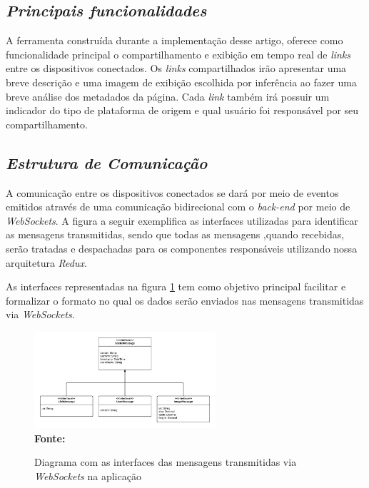 \subsection{{\it Principais funcionalidades}}

A ferramenta construída durante a implementação desse artigo, oferece como funcionalidade principal o compartilhamento e exibição em tempo real de \textit{links} entre os dispositivos conectados.
Os \textit{links} compartilhados irão apresentar uma breve descrição e uma imagem de exibição escolhida por inferência ao fazer uma breve análise dos metadados da página. Cada \textit{link} também irá possuir um indicador do tipo de plataforma de origem e qual usuário foi responsável por seu compartilhamento.

\subsection{{\it Estrutura de Comunicação}}

A comunicação entre os dispositivos conectados se dará por meio de eventos emitidos através de uma comunicação bidirecional com o \textit{back-end} por meio de \textit{WebSockets}. A figura a seguir exemplifica as interfaces utilizadas para identificar as mensagens transmitidas, sendo que todas as mensagens ,quando recebidas, serão tratadas e despachadas para os componentes responsáveis utilizando nossa arquitetura \textit{Redux}. 

As interfaces representadas na figura \ref{fig:figura2} tem como objetivo principal facilitar e formalizar o formato no qual os dados serão enviados nas mensagens transmitidas via \textit{WebSockets}.

\begin{figure}[ht]
	\centering	
	\caption[\hspace{0.1cm}Diagrama com as interfaces das mensagens transmitidas via \textit{WebSockets} na aplicação.]{Diagrama com as interfaces das mensagens transmitidas via \textit{WebSockets} na aplicação}
	\vspace{-0.4cm}
	\includegraphics[width=0.6\textwidth]{figuras/SocketInterfaces.png}
	\vspace{-0.2cm}
	\\\textbf{\footnotesize Fonte: \cite{pressman2011} }
	\label{fig:figura2}
\end{figure}
\vspace{-0.5cm}

